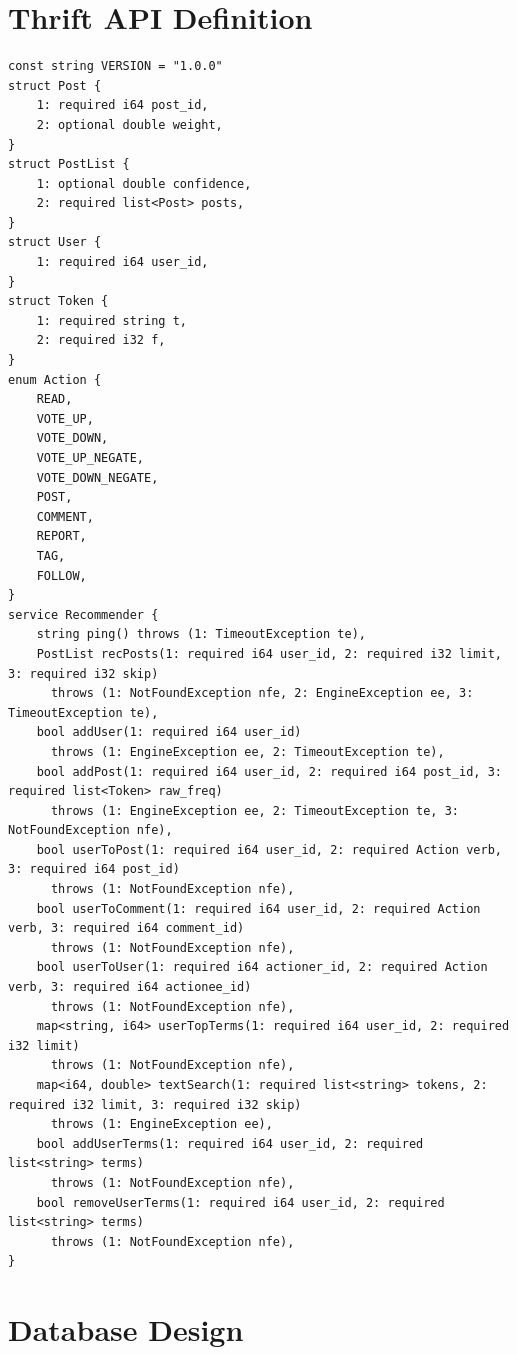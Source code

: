 \documentclass[11pt,letterpaper]{article}
\begin{document}
\newpage
\appendix
\section{Thrift API Definition}
\label{app:thrift}
\begin{verbatim}
const string VERSION = "1.0.0"
struct Post {
    1: required i64 post_id,
    2: optional double weight,
}
struct PostList {
    1: optional double confidence,
    2: required list<Post> posts,
}
struct User {
    1: required i64 user_id,
}
struct Token {
    1: required string t,
    2: required i32 f,
}
enum Action {
    READ,
    VOTE_UP,
    VOTE_DOWN,
    VOTE_UP_NEGATE,
    VOTE_DOWN_NEGATE,
    POST,
    COMMENT,
    REPORT,
    TAG,
    FOLLOW,
}
service Recommender {
    string ping() throws (1: TimeoutException te),
    PostList recPosts(1: required i64 user_id, 2: required i32 limit, 3: required i32 skip)
      throws (1: NotFoundException nfe, 2: EngineException ee, 3: TimeoutException te),
    bool addUser(1: required i64 user_id)
      throws (1: EngineException ee, 2: TimeoutException te),
    bool addPost(1: required i64 user_id, 2: required i64 post_id, 3: required list<Token> raw_freq)
      throws (1: EngineException ee, 2: TimeoutException te, 3: NotFoundException nfe),
    bool userToPost(1: required i64 user_id, 2: required Action verb, 3: required i64 post_id)
      throws (1: NotFoundException nfe),
    bool userToComment(1: required i64 user_id, 2: required Action verb, 3: required i64 comment_id)
      throws (1: NotFoundException nfe),
    bool userToUser(1: required i64 actioner_id, 2: required Action verb, 3: required i64 actionee_id)
      throws (1: NotFoundException nfe),
    map<string, i64> userTopTerms(1: required i64 user_id, 2: required i32 limit)
      throws (1: NotFoundException nfe),
    map<i64, double> textSearch(1: required list<string> tokens, 2: required i32 limit, 3: required i32 skip)
      throws (1: EngineException ee),
    bool addUserTerms(1: required i64 user_id, 2: required list<string> terms)
      throws (1: NotFoundException nfe),
    bool removeUserTerms(1: required i64 user_id, 2: required list<string> terms)
      throws (1: NotFoundException nfe),
}
\end{verbatim}

\section{Database Design}
\end{document}
